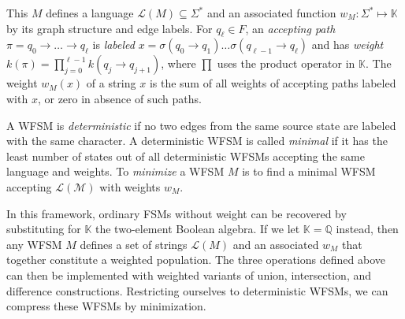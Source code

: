 \documentclass{llncs}
\begin{document}
This $M$ defines a language $\mathcal{L}(M) \subseteq \Sigma^*$ and an associated function $w_M : \Sigma^* \mapsto \mathbb{K}$ by its graph structure and edge labels.
For $q_\ell \in F$,
an \emph{accepting path} $\pi = q_0 \to \ldots \to q_\ell$ is
\emph{labeled} $x = \sigma(q_0 \to q_1) \ldots \sigma(q_{\ell-1} \to q_\ell)$
and has \emph{weight} $k(\pi)=\prod_{j=0}^{\ell-1} k( q_j \to q_{j+1} )$,
where $\prod$ uses the product operator in $\mathbb{K}$.
The weight $w_M(x)$ of a string $x$ is the sum of all weights of accepting paths labeled with $x$, or zero in absence of such paths.

A WFSM is \emph{deterministic} if no two edges from the same source
state are labeled with the same character.
A deterministic WFSM is called \emph{minimal} if it has the least
number of states out of all deterministic WFSMs accepting the same
language and weights.
To \emph{minimize} a WFSM $M$ is to find a minimal WFSM accepting $\mathcal{L(M)}$ with weights $w_M$.

In this framework, ordinary FSMs without weight can be recovered by
substituting for $\mathbb{K}$ the two-element Boolean algebra.
If we let $\mathbb{K}=\mathbb{Q}$ instead,
then any WFSM $M$ defines a set of strings $\mathcal{L}(M)$ and an
associated $w_M$ that together constitute a weighted population.
The three operations defined above can then be implemented with
weighted variants of union, intersection, and difference constructions.
Restricting ourselves to deterministic WFSMs,
we can compress these WFSMs by minimization.



\end{document}
